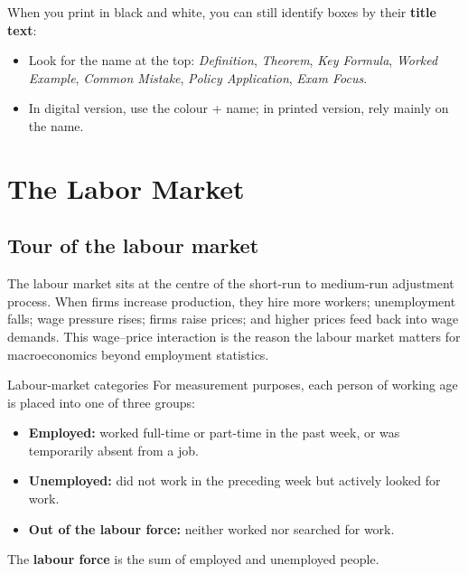 \documentclass[12pt]{article}
\begin{document}
\noindent
When you print in black and white, you can still identify boxes by their \textbf{title text}:
\begin{itemize}
\item Look for the name at the top: \textit{Definition}, \textit{Theorem}, \textit{Key Formula}, \textit{Worked Example}, \textit{Common Mistake}, \textit{Policy Application}, \textit{Exam Focus}.
\item In digital version, use the colour + name; in printed version, rely mainly on the name.
\end{itemize}








\newpage


\newpage



\newpage


\newpage
\section{The Labor Market}

\subsection{Tour of the labour market}

The labour market sits at the centre of the short-run to medium-run adjustment process. When firms increase production, they hire more workers; unemployment falls; wage pressure rises; firms raise prices; and higher prices feed back into wage demands. This wage--price interaction is the reason the labour market matters for macroeconomics beyond employment statistics.

\begin{definition}{Labour-market categories}{}
For measurement purposes, each person of working age is placed into one of three groups:
\begin{itemize}[leftmargin=1.5em]
\item \textbf{Employed:} worked full-time or part-time in the past week, or was temporarily absent from a job.
\item \textbf{Unemployed:} did not work in the preceding week but actively looked for work.
\item \textbf{Out of the labour force:} neither worked nor searched for work.
\end{itemize}
The \textbf{labour force} is the sum of employed and unemployed people.
\end{definition}
\end{document}
